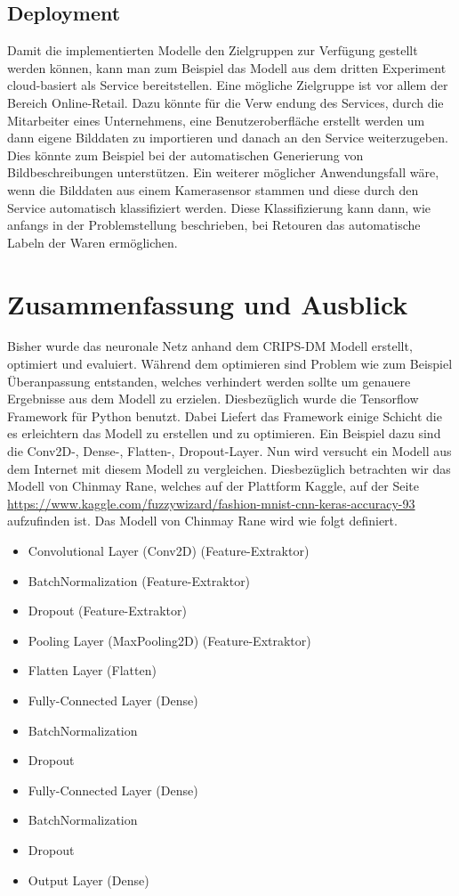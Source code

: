 \documentclass[12pt]{scrreprt}
\begin{document}
\section{Deployment}\label{dp:dp}

Damit die implementierten Modelle den Zielgruppen zur Verfügung gestellt werden können, kann man zum Beispiel das Modell aus dem dritten Experiment cloud-basiert als Service bereitstellen. Eine mögliche Zielgruppe ist vor allem der Bereich Online-Retail. Dazu könnte für die Verw endung des Services, durch die Mitarbeiter eines Unternehmens, eine Benutzeroberfläche erstellt werden um dann eigene Bilddaten zu importieren und danach an den Service weiterzugeben. Dies könnte zum Beispiel bei der automatischen Generierung von Bildbeschreibungen unterstützen. Ein weiterer möglicher Anwendungsfall wäre, wenn die Bilddaten aus einem Kamerasensor stammen und diese durch den Service automatisch klassifiziert werden. Diese Klassifizierung kann dann, wie anfangs in der Problemstellung beschrieben, bei Retouren das automatische Labeln der Waren ermöglichen. 

\newpage
\chapter{Zusammenfassung und Ausblick}\label{zsm:zsm}


Bisher wurde das neuronale Netz anhand dem CRIPS-DM Modell erstellt, optimiert und evaluiert. Während dem optimieren sind Problem wie zum Beispiel Überanpassung entstanden, welches verhindert werden sollte um genauere Ergebnisse aus dem Modell zu erzielen. Diesbezüglich wurde die Tensorflow Framework für Python benutzt. Dabei Liefert das Framework einige Schicht die es erleichtern das Modell zu erstellen und zu optimieren. Ein Beispiel dazu sind die Conv2D-, Dense-, Flatten-, Dropout-Layer. Nun wird versucht ein Modell aus dem Internet mit diesem Modell zu vergleichen. Diesbezüglich betrachten wir das Modell von Chinmay Rane, welches auf der Plattform Kaggle, auf der Seite \url{https://www.kaggle.com/fuzzywizard/fashion-mnist-cnn-keras-accuracy-93} aufzufinden ist. Das Modell von Chinmay Rane wird wie folgt definiert. 

\begin{itemize}
	\item Convolutional Layer (Conv2D) (Feature-Extraktor)
	\item BatchNormalization (Feature-Extraktor)
	\item Dropout (Feature-Extraktor)
	\item Pooling Layer (MaxPooling2D) (Feature-Extraktor)
	\item Flatten Layer (Flatten)
	\item Fully-Connected Layer (Dense)
	\item BatchNormalization
	\item Dropout
	\item Fully-Connected Layer (Dense)
	\item BatchNormalization
	\item Dropout
	\item Output Layer (Dense)
	\label{tab:modelvonChinmayRane}
\end{itemize}
\end{document}
